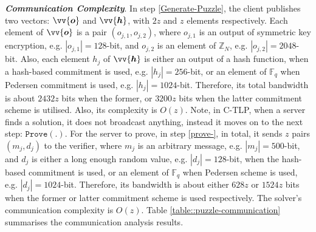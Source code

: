  \noindent\textbf{\textit{Communication Complexity}}.  In step \ref{Generate-Puzzle}, the client publishes two vectors: $\vv{\bm{o}}$ and $\vv{\bm{h}}$, with  $2 z$ and $z$ elements respectively.  Each element of $\vv{\bm{o}}$ is a pair $(o_{\scriptscriptstyle j,1},o_{\scriptscriptstyle j,2})$, where $o_{\scriptscriptstyle j,1}$ is an output of symmetric key encryption, e.g.   $|o_{\scriptscriptstyle j,1}|=128$-bit, and $o_{\scriptscriptstyle j,2}$ is an element of $\mathbb{Z}_{\scriptscriptstyle N}$, e.g.  $|o_{\scriptscriptstyle j,2}|=2048$-bit. Also, each element $h_{\scriptscriptstyle j}$ of $\vv{\bm{h}}$ is either an output of a hash function, when a hash-based commitment is used, e.g.  $|h_{\scriptscriptstyle j}|=256$-bit, or an element of $\mathbb{F}_{\scriptscriptstyle q}$ when Pedersen commitment is used, e.g.  $|h_{\scriptscriptstyle j}|=1024$-bit. Therefore, its total bandwidth is about $2432 z$ bits when the former,  or $3200 z$ bits when the latter commitment scheme is utilised. Also, its   complexity is $O(z)$. Note,  in  C-TLP, when a server finds a solution, it does not broadcast anything, instead it moves on  to the next step:  $\mathtt{Prove}(.)$. For the server to prove, in step \ref{prove-},  in total,  it sends $z$ pairs $(m_{\scriptscriptstyle j},d_{\scriptscriptstyle j})$ to the verifier, where $m_{\scriptscriptstyle j}$  is an arbitrary message, e.g.  $|m_{\scriptscriptstyle j}|=500$-bit, and  $d_{\scriptscriptstyle j}$ is either a long enough random value, e.g. $|d_{\scriptscriptstyle j}|=128$-bit, when the hash-based commitment is used, or an element of $\mathbb{F}_{\scriptscriptstyle q}$ when Pedersen scheme is used, e.g. $|d_{\scriptscriptstyle j}|=1024$-bit. Therefore, its bandwidth is about either $628 z$ or $1524 z$ bits when the former or latter commitment scheme is used respectively. The solver's  communication complexity is $O(z)$. Table \ref{table::puzzle-communication} summarises the communication analysis results.
 


 
